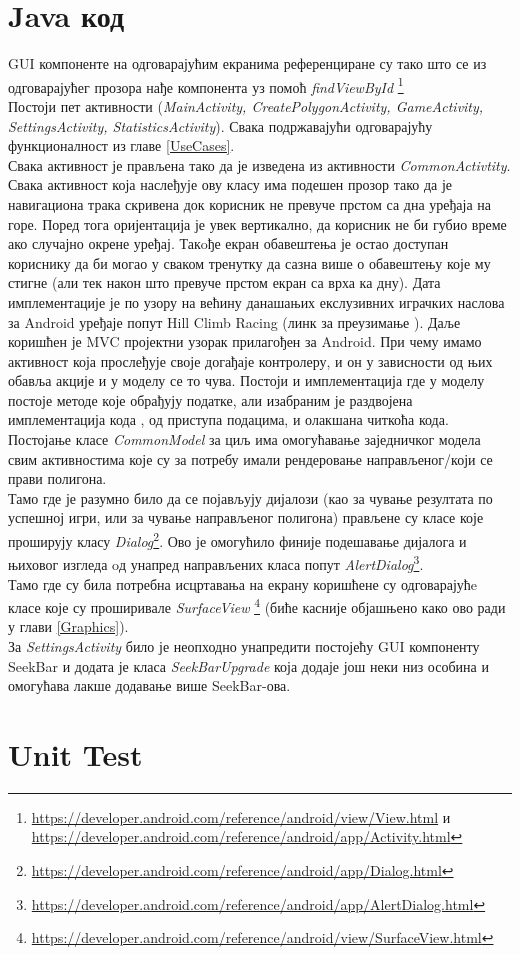 \section{Java код}
GUI компоненте на одговарајућим екранима референциране су тако што се из одговарајућег прозора нађе компонента уз помоћ \emph{findViewById} \footnote{\url{https://developer.android.com/reference/android/view/View.html} и \url{https://developer.android.com/reference/android/app/Activity.html}}
\\ \indent 
Постоји пет активности (\emph{MainActivity, CreatePolygonActivity, GameActivity, SettingsActivity, StatisticsActivity}). Свака подржавајући одговарајућу функционалност из главе \ref{UseCases}.
\\ \indent 
Свака активност је прављена тако да је изведена из активности \emph{CommonActivtity}. Свака активност која наслеђује ову класу има подешен прозор тако да је навигациона трака скривена док корисник не превуче прстом са дна уређаја на горе. Поред тога оријентација је увек вертикално, да корисник не би губио време ако случајно окрене уређај. Такoђе екран обавештења је остао доступан кориснику да би могао у сваком тренутку да сазна више о обавештењу које му стигне (али тек након што превуче прстом екран са врха ка дну).
 Дата имплементације је по узору на већину данашањих екслузивних играчких наслова за Android уређаје попут Hill Climb Racing (линк за преузимање \cite{HillCR}). Даље коришћен је MVC пројектни узорак прилагођен за Android. При чему имамо активност која прослеђује своје догађаје контролеру, и он у зависности од њих обавља акције и у моделу се то чува. Постоји и имплементација где у моделу постоје методе које обрађују податке, али изабраним је раздвојена имплементација кода , од приступа подацима, и олакшана читкоћа кода. 
 \\ \indent
 Постојање класе \emph{CommonModel} за циљ има омогућавање заједничког модела свим активностима које су за потребу имали рендеровање направљеног/који се прави полигона. 
 \\ \indent
 Тамо где је разумно било да се појављују дијалози (као за чување резултата по успешној игри, или за чување направљеног полигона) прављене су класе које проширују класу 
 \emph{Dialog}\footnote{\url{https://developer.android.com/reference/android/app/Dialog.html}}. 
 Ово је омогућило финије подешавање дијалога и њиховог изгледа oд унапред направљених класа попут \emph{AlertDialog}\footnote{\url{https://developer.android.com/reference/android/app/AlertDialog.html}}.
\\ \indent 
Тамо где су била потребна исцртавања на екрану коришћене су одговарајућe класе које су проширивале \emph{SurfaceView} \footnote{\url{https://developer.android.com/reference/android/view/SurfaceView.html}} (биће касније објашњено како ово ради у глави \ref{Graphics}). 
\\ \indent 
За \emph{SettingsActivity} било је неопходно унапредити постојећу GUI компоненту SeekBar и додата је класа \emph{SeekBarUpgrade} која додаје још неки низ особина и омогућава лакше додавање више SeekBar-ова.

\section{Unit Test}